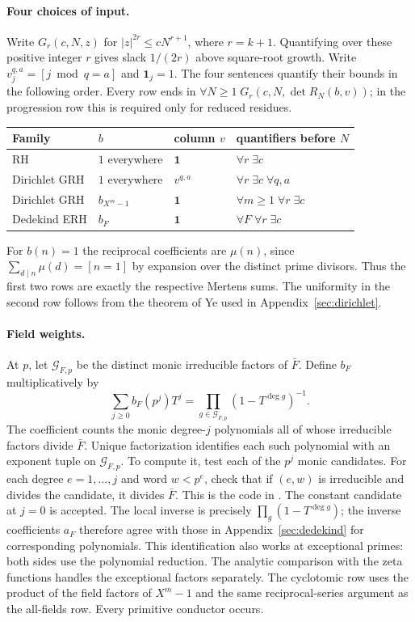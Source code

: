 \paragraph{Four choices of input.}
Write $G_r(c,N,z)$ for $|z|^{2r}\le cN^{r+1}$, where $r=k+1$. Quantifying over these positive integer $r$ gives slack $1/(2r)$ above square-root growth. Write $v^{q,a}_j=[j\bmod q=a]$ and $\mathbf1_j=1$. The four sentences quantify their bounds in the following order. Every row ends in $\forall N\ge1\;G_r(c,N,\det R_N(b,v))$; in the progression row this is required only for reduced residues.
\begin{center}\small
\begin{tabular}{@{}llll@{}}\toprule
Family & $b$ & column $v$ & quantifiers before $N$\\\midrule
RH & $1$ everywhere & $\mathbf1$ & $\forall r\;\exists c$\\
Dirichlet GRH & $1$ everywhere & $v^{q,a}$ & $\forall r\;\exists c\;\forall q,a$\\
Dirichlet GRH & $b_{X^m-1}$ & $\mathbf1$ & $\forall m\ge1\;\forall r\;\exists c$\\
Dedekind ERH & $b_F$ & $\mathbf1$ & $\forall F\;\forall r\;\exists c$\\\bottomrule
\end{tabular}
\end{center}
For $b(n)=1$ the reciprocal coefficients are $\mu(n)$, since $\sum_{d\mid n}\mu(d)=[n=1]$ by expansion over the distinct prime divisors. Thus the first two rows are exactly the respective Mertens sums. The uniformity in the second row follows from the theorem of Ye used in Appendix~\ref{sec:dirichlet}.

\paragraph{Field weights.}
At $p$, let $\mathcal G_{F,p}$ be the distinct monic irreducible factors of $\bar F$. Define $b_F$ multiplicatively by
\[
 \sum_{j\ge0} b_F(p^j)T^j=\prod_{g\in\mathcal G_{F,p}}(1-T^{\deg g})^{-1}.
\]
The coefficient counts the monic degree-$j$ polynomials all of whose irreducible factors divide $\bar F$. Unique factorization identifies each such polynomial with an exponent tuple on $\mathcal G_{F,p}$. To compute it, test each of the $p^j$ monic candidates. For each degree $e=1,\ldots,j$ and word $w<p^e$, check that if $(e,w)$ is irreducible and divides the candidate, it divides $\bar F$. This is the code in . The constant candidate at $j=0$ is accepted. The local inverse is precisely $\prod_g(1-T^{\deg g})$; the inverse coefficients $a_F$ therefore agree with those in Appendix~\ref{sec:dedekind} for corresponding polynomials. This identification also works at exceptional primes: both sides use the polynomial reduction. The analytic comparison with the zeta functions handles the exceptional factors separately. The cyclotomic row uses the product of the field factors of $X^m-1$ and the same reciprocal-series argument as the all-fields row. Every primitive conductor occurs.

